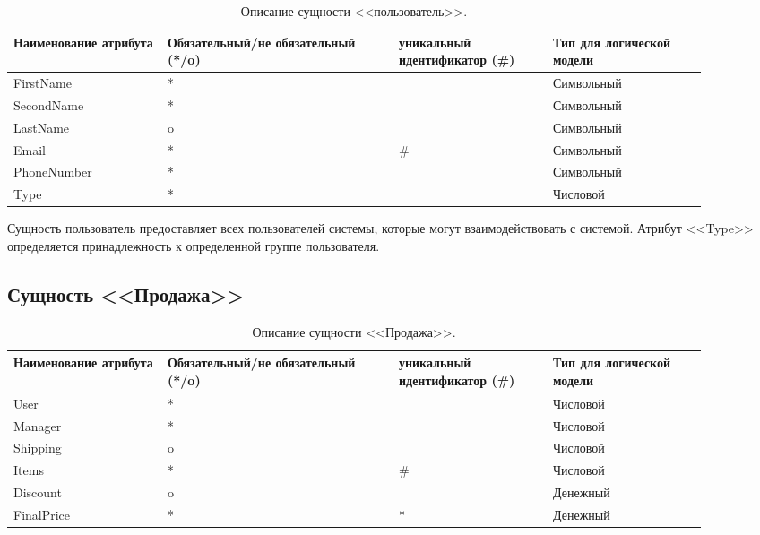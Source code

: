 \documentclass[14pt]{extreport}
\begin{document}
            \begin{table}[H]
                \begin{tabular}{|p{0.2\linewidth}|p{0.3\linewidth}|p{0.2\linewidth}|p{0.2\linewidth}|}
                    \hline
                    Наименование атрибута & Обязательный/не обязательный (*/o) & уникальный идентификатор (\#) & Тип для логической модели
                    \\ \hline
                    FirstName & * & & Символьный\\ \hline
                    SecondName & * & & Символьный\\ \hline
                    LastName & o & & Символьный \\ \hline
                    Email & * & \# & Символьный  \\ \hline
                    PhoneNumber & * & & Символьный\\ \hline
                    Type & * & & Числовой \\ \hline
                \end{tabular}

                \caption{Описание сущности <<пользователь>>.}
            \end{table}
        
        Сущность пользователь предоставляет всех пользователей системы, которые могут взаимодействовать с системой. Атрибут <<Type>> определяется принадлежность к определенной группе пользователя.

    \subsection*{Сущность <<Продажа>>}

        \begin{table}[H]
            \begin{tabular}{|p{0.2\linewidth}|p{0.3\linewidth}|p{0.2\linewidth}|p{0.2\linewidth}|}
                \hline
                Наименование атрибута & Обязательный/не обязательный (*/o) & уникальный идентификатор (\#) & Тип для логической модели
                \\ \hline
                User & * & & Числовой\\ \hline
                Manager & * & & Числовой\\ \hline
                Shipping & o & & Числовой \\ \hline
                Items & * & \# & Числовой  \\ \hline
                Discount & o & & Денежный \\ \hline  
                FinalPrice & * & * & Денежный \\ \hline
            \end{tabular}
            \caption{Описание сущности <<Продажа>>.}
        \end{table}
\end{document}
